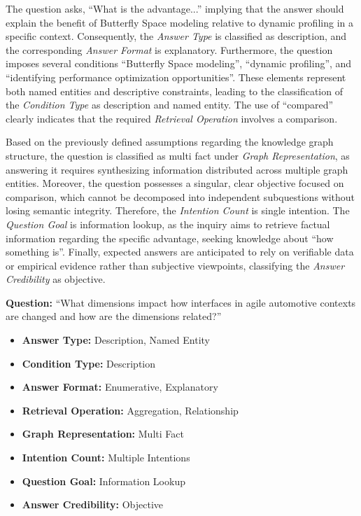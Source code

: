 The question asks, \enquote{What is the advantage...} implying that the answer should explain the benefit of Butterfly Space modeling relative to dynamic profiling in a specific context. Consequently, the \emph{Answer Type} is classified as description, and the corresponding \emph{Answer Format} is explanatory. Furthermore, the question imposes several conditions \enquote{Butterfly Space modeling}, \enquote{dynamic profiling}, and \enquote{identifying performance optimization opportunities}. These elements represent both named entities and descriptive constraints, leading to the classification of the \emph{Condition Type} as description and named entity. The use of \enquote{compared} clearly indicates that the required \emph{Retrieval Operation} involves a comparison.

Based on the previously defined assumptions regarding the knowledge graph structure, the question is classified as multi fact under \emph{Graph Representation}, as answering it requires synthesizing information distributed across multiple graph entities. Moreover, the question possesses a singular, clear objective focused on comparison, which cannot be decomposed into independent subquestions without losing semantic integrity. Therefore, the \emph{Intention Count} is single intention. The \emph{Question Goal} is information lookup, as the inquiry aims to retrieve factual information regarding the specific advantage, seeking knowledge about \enquote{how something is}. Finally, expected answers are anticipated to rely on verifiable data or empirical evidence rather than subjective viewpoints, classifying the \emph{Answer Credibility} as objective.


\textbf{Question:} \enquote{What dimensions impact how interfaces in agile automotive contexts are changed and how are the dimensions related?} \cite{wohlrab_interfaces_2019}
\begin{itemize}[label={}]
    \item \textbf{Answer Type:} Description, Named Entity
    \item \textbf{Condition Type:} Description
    \item \textbf{Answer Format:} Enumerative, Explanatory
    \item \textbf{Retrieval Operation:} Aggregation, Relationship
    \item \textbf{Graph Representation:} Multi Fact
    \item \textbf{Intention Count:} Multiple Intentions
    \item \textbf{Question Goal:} Information Lookup
    \item \textbf{Answer Credibility:} Objective
\end{itemize}

